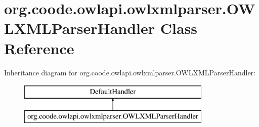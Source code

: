 \hypertarget{classorg_1_1coode_1_1owlapi_1_1owlxmlparser_1_1_o_w_l_x_m_l_parser_handler}{\section{org.\-coode.\-owlapi.\-owlxmlparser.\-O\-W\-L\-X\-M\-L\-Parser\-Handler Class Reference}
\label{classorg_1_1coode_1_1owlapi_1_1owlxmlparser_1_1_o_w_l_x_m_l_parser_handler}
}
Inheritance diagram for org.\-coode.\-owlapi.\-owlxmlparser.\-O\-W\-L\-X\-M\-L\-Parser\-Handler\-:\begin{figure}[H]
\begin{center}
\leavevmode
\includegraphics[height=2.000000cm]{classorg_1_1coode_1_1owlapi_1_1owlxmlparser_1_1_o_w_l_x_m_l_parser_handler}
\end{center}
\end{figure}
